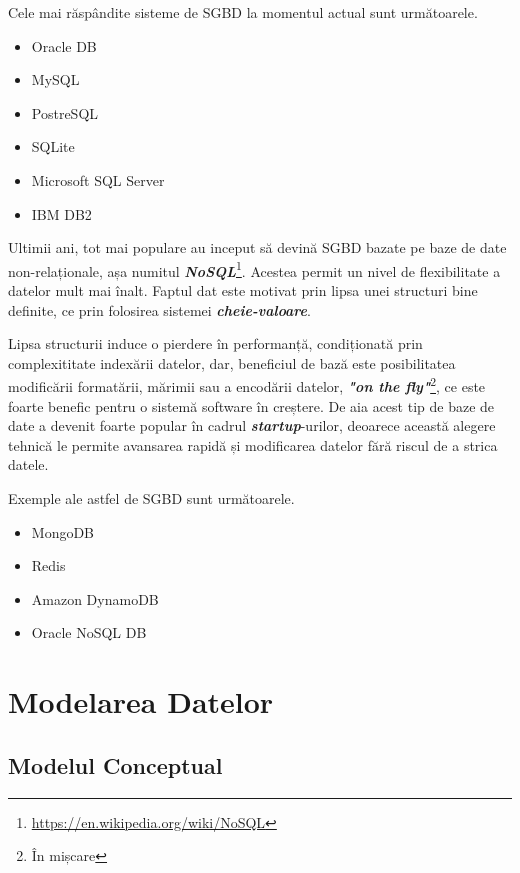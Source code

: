 \documentclass[12pt. a4paper]{report}
\begin{document}
Cele mai răspândite sisteme de SGBD la momentul actual sunt următoarele.
\begin{itemize}
	\item Oracle DB
	\item MySQL
	\item PostreSQL
	\item SQLite
	\item Microsoft SQL Server
	\item IBM DB2
\end{itemize}

Ultimii ani, tot mai populare au inceput să devină SGBD bazate pe baze de date non-relaționale, așa numitul \emph{\textbf{NoSQL}}\footnote{\url{https://en.wikipedia.org/wiki/NoSQL}}. Acestea permit un nivel de flexibilitate a datelor mult mai înalt. Faptul dat este motivat prin lipsa unei structuri bine definite, ce prin folosirea sistemei \emph{\textbf{cheie-valoare}}.

Lipsa structurii induce o pierdere în performanță, condiționată prin complexititate indexării datelor, dar, beneficiul de bază este posibilitatea modificării formatării, mărimii sau a encodării datelor, \emph{\textbf{"on the fly"}}\footnote{În mișcare}, ce este foarte benefic pentru o sistemă software în creștere. De aia acest tip de baze de date a devenit foarte popular în cadrul \emph{\textbf{startup}}-urilor, deoarece această alegere tehnică le permite avansarea rapidă și modificarea datelor fără riscul de a strica datele.

Exemple ale astfel de SGBD sunt următoarele.
\begin{itemize}
	\item MongoDB
	\item Redis
	\item Amazon DynamoDB
	\item Oracle NoSQL DB
\end{itemize}

\chapter{Modelarea Datelor}

\section{Modelul Conceptual}
\end{document}
